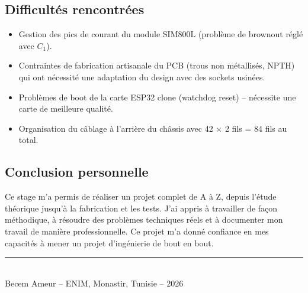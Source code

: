 \documentclass[12pt,a4paper]{article}
\begin{document}
\subsection*{Difficultés rencontrées}
\begin{itemize}
    \item Gestion des pics de courant du module SIM800L (problème de brownout réglé avec $C_1$).
    \item Contraintes de fabrication artisanale du PCB (trous non métallisés, NPTH) qui ont nécessité une adaptation du design avec des sockets usinées.
    \item Problèmes de boot de la carte ESP32 clone (watchdog reset) -- nécessite une carte de meilleure qualité.
    \item Organisation du câblage à l'arrière du châssis avec 42 × 2 fils = 84 fils au total.
\end{itemize}

\subsection*{Conclusion personnelle}
Ce stage m'a permis de réaliser un projet complet de A à Z, depuis l'étude théorique jusqu'à la fabrication et les tests. J'ai appris à travailler de façon méthodique, à résoudre des problèmes techniques réels et à documenter mon travail de manière professionnelle. Ce projet m'a donné confiance en mes capacités à mener un projet d'ingénierie de bout en bout.

\bigskip
\begin{center}
\rule{0.4\linewidth}{0.4pt}\\[0.3cm]
{\small Becem Ameur -- ENIM, Monastir, Tunisie -- 2026}
\end{center}
\end{document}
